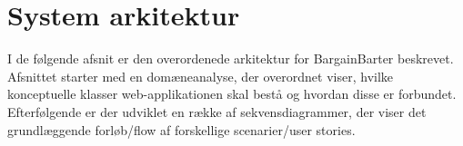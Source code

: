 \chapter{System arkitektur}\label{ch:Systemarkitektur}
I de følgende afsnit er den overordenede arkitektur for BargainBarter beskrevet. Afsnittet starter med en domæneanalyse, der overordnet viser, hvilke konceptuelle klasser web-applikationen skal bestå og hvordan disse er forbundet. Efterfølgende er der udviklet en række af sekvensdiagrammer, der viser det grundlæggende forløb/flow af forskellige scenarier/user stories.